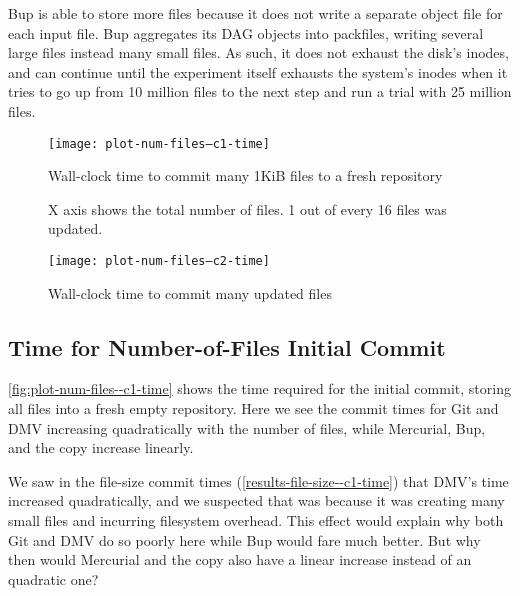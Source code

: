 Bup is able to store more files because it does not write a separate object file
for each input file. Bup aggregates its DAG objects into \glspl{packfile},
writing several large files instead many small files. As such, it does not
exhaust the disk's \glspl{inode}, and can continue until the experiment itself
exhausts the system's \glspl{inode} when it tries to go up from \num{10} million
files to the next step and run a trial with \num{25} million files.

%

\begin{figure}[p]
    \begin{leftfullpage}
        \caption{Wall-clock time to commit many 1KiB files to a fresh repository}
        \label{fig:plot-num-files--c1-time}
        \centering

        \explainlogsubfig

        \texttt{[image: plot-num-files--c1-time]}
    \end{leftfullpage}
\end{figure}

\begin{figure}[p]
    \begin{leftfullpage}
        \caption{Wall-clock time to commit many updated files}
        \label{fig:plot-num-files--c2-time}
        \centering

        X axis shows the total number of files. 1 out of every 16 files was
        updated.

        \explainlogsubfig

        \texttt{[image: plot-num-files--c2-time]}
    \end{leftfullpage}
\end{figure}

\cleardoublepage

\subsection{Time for Number-of-Files Initial Commit}
\label{results-num-files--c1-time}

\autoref{fig:plot-num-files--c1-time} shows the time required for the initial
\gls{commit}, storing all files into a fresh empty \gls{repository}. Here we see
the commit times for Git and DMV increasing quadratically with the number of
files, while Mercurial, Bup, and the copy increase linearly.

We saw in the file-size commit times (\autoref{results-file-size--c1-time}) that
DMV's time increased quadratically, and we suspected that was because it was
creating many small files and incurring filesystem overhead. This effect would
explain why both Git and DMV do so poorly here while Bup would fare much better.
But why then would Mercurial and the copy also have a linear increase instead of
an quadratic one?

